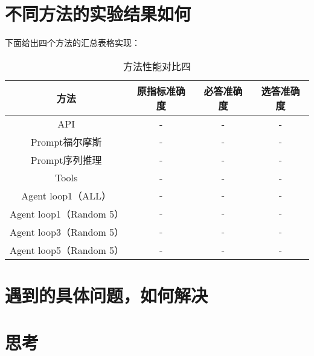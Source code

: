 \documentclass[answers]{exam}  %
\begin{document}
\section{不同方法的实验结果如何}

下面给出四个方法的汇总表格实现：
\begin{table}[h]
    \centering
    \begin{tabular}{cccc}
    \toprule
    \textbf{方法} & \textbf{原指标准确度} & \textbf{必答准确度} &\textbf{选答准确度}\\
    \midrule
    API & - & - & - \\
    \hline
    Prompt福尔摩斯 & - & - & - \\
    \hline
    Prompt序列推理 & - & - & - \\
    \hline
    Tools & - & - & - \\
    \hline
    Agent loop1（ALL） & - & - & - \\
    \hline
    Agent loop1（Random 5） & - & - & - \\
    \hline
    Agent loop3（Random 5） & - & - & - \\
    \hline
    Agent loop5（Random 5） & - & - & - \\
    \bottomrule
    \end{tabular}
    \caption{方法性能对比四}
\end{table}


\section{遇到的具体问题，如何解决}

\section{思考}
\end{document}
